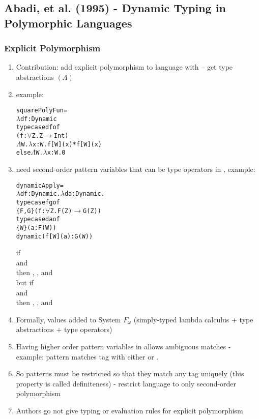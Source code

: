 \documentclass[12pt]{article}	%
\begin{document}
\subsection*{Abadi, et al. (1995) - Dynamic Typing in Polymorphic Languages}

\subsubsection*{Explicit Polymorphism}
\begin{enumerate}
	\item Contribution: add explicit polymorphism to language with \Dynamic -- get type abstractions $(\Lambda)$
	\item example:
	\begin{alltt}
	squarePolyFun = 
	  \(\lambda\)df:Dynamic
	    typecase df of
	      (f:\(\forall\)Z.Z\(\rightarrow\)Int)
	        \(\Lambda\)W.\(\lambda\)x:W.f[W](x)*f[W](x)
	      else \(\Lambda\)W.\(\lambda\)x:W.0
	\end{alltt}
	\item need second-order pattern variables that can be type operators in \typecase, example:
	\begin{alltt}
	dynamicApply = 
	  \(\lambda\)df:Dynamic.\(\lambda\)da:Dynamic.
	    typecase fg of
	      \{F,G\} (f:\(\forall\)Z.F(Z)\(\rightarrow\)G(Z))
	        typecase da of
	          \{W\} (a:F(W))
	            dynamic( f[W](a):G(W) )
	\end{alltt}
	if  \\
	and  \\
	then , , and  \\
	but if  \\
	and  \\
	then , , and  \\
	
	\item Formally, \Dynamic values added to System $F_\omega$ (simply-typed lambda calculus + type abstractions + type operators)
	\item Having higher order pattern variables in \typecase allows ambiguous matches - example: pattern  matches tag  with either  or .
	\item So patterns must be restricted so that they match any tag uniquely (this property is called definiteness) - restrict language to only second-order polymorphism
	\item Authors go not give typing or evaluation rules for explicit polymorphism
\end{enumerate}
\end{document}
